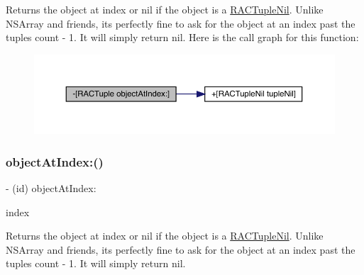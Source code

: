 Returns the object at {\ttfamily index} or nil if the object is a \mbox{\hyperlink{interface_r_a_c_tuple_nil}{R\+A\+C\+Tuple\+Nil}}. Unlike N\+S\+Array and friends, it\textquotesingle{}s perfectly fine to ask for the object at an index past the tuple\textquotesingle{}s count -\/ 1. It will simply return nil. Here is the call graph for this function\+:\nopagebreak
\begin{figure}[H]
\begin{center}
\leavevmode
\includegraphics[width=350pt]{interface_r_a_c_tuple_a70c9deecd1588c4544493a48dfc20660_cgraph}
\end{center}
\end{figure}
\mbox{\label{interface_r_a_c_tuple_a70c9deecd1588c4544493a48dfc20660}} 
\subsubsection{\texorpdfstring{object\+At\+Index\+:()}{objectAtIndex:()}\hspace{0.1cm}{\footnotesize\ttfamily [3/3]}}
{\footnotesize\ttfamily -\/ (id) object\+At\+Index\+: \begin{DoxyParamCaption}\item[{(N\+S\+U\+Integer)}]{index }\end{DoxyParamCaption}}

Returns the object at {\ttfamily index} or nil if the object is a \mbox{\hyperlink{interface_r_a_c_tuple_nil}{R\+A\+C\+Tuple\+Nil}}. Unlike N\+S\+Array and friends, it\textquotesingle{}s perfectly fine to ask for the object at an index past the tuple\textquotesingle{}s count -\/ 1. It will simply return nil. \mbox{\label{interface_r_a_c_tuple_ad2360332f752318fc924727c17eb67c9}} 
